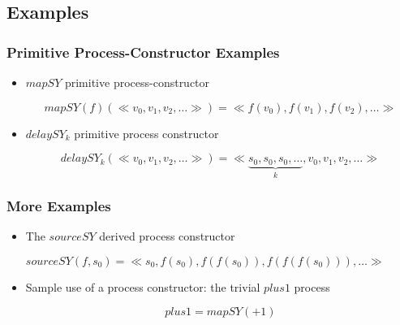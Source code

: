 \documentclass{beamer}
\begin{document}
\subsection{Examples}
\beamerdefaultoverlayspecification{<+->}
\begin{frame}
  \frametitle{Primitive Process-Constructor Examples}
  \begin{itemize}
  \item \textbf{$mapSY$} primitive process-constructor
    \begin{center}
      
    \end{center}
    $$mapSY(f)(\ll v_0,v_1,v_2,\dots \gg) = \ll f(v_0),f(v_1),f(v_2),\dots \gg $$  
  \item \textbf{$delaySY_k$} primitive process constructor
    \begin{center}
    \end{center}
    $$delaySY_k(\ll v_0,v_1,v_2,\dots \gg) = \ll \underbrace{s_0,s_0,s_0,\dots}_k,v_0,v_1,v_2,\dots \gg $$  
\end{itemize}
\end{frame}

\begin{frame}
  \frametitle{More Examples}
  \begin{itemize}
  \item The \textbf{$sourceSY$} derived process constructor
    \begin{center}
      
    
    $sourceSY(f,s_0) = \ll s_0,f(s_0),f(f(s_0)),f(f(f(s_0))),\dots \gg $  
    \end{center}

  \item Sample use of a process constructor: the trivial $plus1$ process
    \begin{center}
    \end{center}
    $$plus1 = mapSY(+1)$$  

\end{itemize}
\end{frame}
\end{document}
